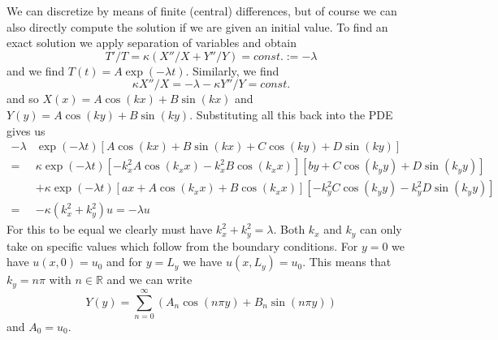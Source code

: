 \documentclass[10pt,a4paper]{article}
\begin{document}
We can discretize by means of finite (central) differences, but of course we can also directly compute the solution if we are given an initial value.
To find an exact solution we apply separation of variables and obtain
\begin{equation*}
  T'/T = \kappa (X''/X + Y''/Y) = const. := -\lambda
\end{equation*}
and we find $T(t) = A \exp(-\lambda t).$
Similarly, we find
\begin{equation*}
  \kappa X''/X = -\lambda - \kappa Y''/Y = const.
\end{equation*}
and so $X(x) =  A \cos(kx) + B \sin(kx)$ and $Y(y) = A \cos(ky) + B \sin(ky).$
Substituting all this back into the PDE gives us
\begin{align*}
  -\lambda &\exp(-\lambda t) \left[A\cos(kx) + B\sin(kx) + C\cos(ky) + D\sin(ky)\right] \\
  =&\kappa \exp(-\lambda t) \left[ -k_x^2 A\cos(k_xx)  -k_x^2B\cos(k_xx)\right]\left[by +  C\cos(k_yy) + D\sin(k_yy)\right] \\
           &+ \kappa \exp(-\lambda t) \left[ ax +  A\cos(k_xx)  + B\cos(k_xx)\right]\left[-k_y^2C\cos(k_yy) - k_y^2 D\sin(k_yy)\right] \\
  =& -\kappa (k_x^2  + k_y^2) u = -\lambda u
\end{align*}
For this to be equal we clearly must have $k_x^2  + k_y^2 = \lambda.$
Both $k_x$ and $k_y$ can only take on specific values which follow from the boundary conditions.
For $y=0$ we have $u(x,0) = u_0$ and for $y = L_y$ we have $u(x,L_y) = u_0.$ This means that $k_y= n \pi$ with $n \in \mathbb{R}$ and we can write
\begin{equation*}
  Y(y) = \sum_{n=0}^\infty (A_n\cos(n \pi y) + B_n \sin(n\pi y))
\end{equation*}
and $A_0 = u_0.$
\end{document}
